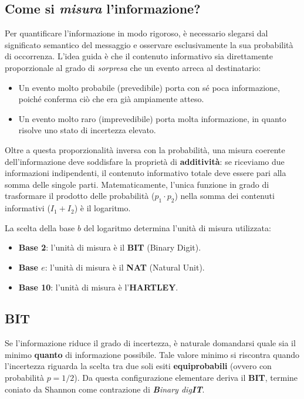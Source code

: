 \subsection{Come si \textit{misura} l'informazione?}

Per quantificare l'informazione in modo rigoroso, è necessario slegarsi dal significato semantico del messaggio e osservare esclusivamente la sua probabilità di occorrenza. L'idea guida è che il contenuto informativo sia direttamente proporzionale al grado di \textit{sorpresa} che un evento arreca al destinatario:

\begin{itemize}
    \item Un evento molto probabile (prevedibile) porta con sé poca informazione, poiché conferma ciò che era già ampiamente atteso.
    \item Un evento molto raro (imprevedibile) porta molta informazione, in quanto risolve uno stato di incertezza elevato.
\end{itemize}

Oltre a questa proporzionalità inversa con la probabilità, una misura coerente dell'informazione deve soddisfare la proprietà di \textbf{additività}: se riceviamo due informazioni indipendenti, il contenuto informativo totale deve essere pari alla somma delle singole parti. Matematicamente, l'unica funzione in grado di trasformare il prodotto delle probabilità ($p_1 \cdot p_2$) nella somma dei contenuti informativi ($I_1 + I_2$) è il logaritmo.

La scelta della base $b$ del logaritmo determina l'unità di misura utilizzata:
\begin{itemize}
    \item \textbf{Base 2}: l'unità di misura è il \textbf{BIT} (Binary Digit).
    \item \textbf{Base $e$}: l'unità di misura è il \textbf{NAT} (Natural Unit).
    \item \textbf{Base 10}: l'unità di misura è l'\textbf{HARTLEY}.
\end{itemize}

\subsection{BIT}
Se l'informazione riduce il grado di incertezza, è naturale domandarsi quale sia il minimo \textbf{quanto} di informazione possibile. Tale valore minimo si riscontra quando l'incertezza riguarda la scelta tra due soli esiti \textbf{equiprobabili} (ovvero con probabilità $p=1/2$). Da questa configurazione elementare deriva il \textbf{BIT}, termine coniato da Shannon come contrazione di \textit{\textbf{B}inary dig\textbf{IT}}.

